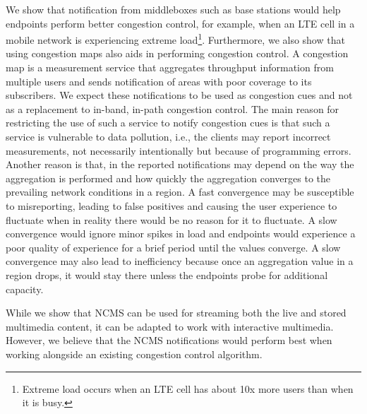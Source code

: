 We show that notification from middleboxes such as base stations would
help endpoints perform better congestion control, for example, when an LTE cell 
in a mobile network is experiencing extreme load\footnote{Extreme load
occurs when an LTE cell has about 10x more users than when it is busy.}.
Furthermore, we also show that using congestion maps also aids in performing
congestion control. A congestion map is a measurement service that aggregates
throughput information from multiple users and sends notification of areas
with poor coverage to its subscribers. We expect these notifications to be
used as congestion cues and not as a replacement to in-band, in-path
congestion control. The main reason for restricting the use of such a service
to notify congestion cues is that such a service is vulnerable to data
pollution, i.e., the clients may report incorrect measurements, not
necessarily intentionally but because of programming errors. Another reason is
that, in the reported notifications may depend on the way the aggregation is
performed and how quickly the aggregation converges to the prevailing network
conditions in a region. A fast convergence may be susceptible to misreporting,
leading to false positives and causing the user experience to fluctuate when in
reality there would be no reason for it to fluctuate. A slow convergence would
ignore minor spikes in load and endpoints would experience a poor quality of
experience for a brief period until the values converge. A slow convergence
may also lead to inefficiency because once an aggregation value in a region
drops, it would stay there unless the endpoints probe for additional capacity.

While we show that NCMS can be used for streaming both the live and stored
multimedia content, it can be adapted to work with interactive multimedia.
However, we believe that the NCMS notifications would perform best when
working alongside an existing congestion control algorithm.
